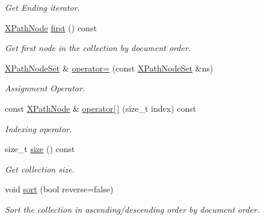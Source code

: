 \begin{DoxyCompactItemize}
\begin{DoxyCompactList}\small\item\em Get Ending iterator. \item\end{DoxyCompactList}\item 
\hyperlink{classphys_1_1xml_1_1XPathNode}{XPathNode} \hyperlink{classphys_1_1xml_1_1XPathNodeSet_ae38baf21701ebbe42af3abfb6976d100}{first} () const 
\begin{DoxyCompactList}\small\item\em Get first node in the collection by document order. \item\end{DoxyCompactList}\item 
\hyperlink{classphys_1_1xml_1_1XPathNodeSet}{XPathNodeSet} \& \hyperlink{classphys_1_1xml_1_1XPathNodeSet_a10ab6b5b2188af5d7db6930473fa0190}{operator=} (const \hyperlink{classphys_1_1xml_1_1XPathNodeSet}{XPathNodeSet} \&ns)
\begin{DoxyCompactList}\small\item\em Assignment Operator. \item\end{DoxyCompactList}\item 
const \hyperlink{classphys_1_1xml_1_1XPathNode}{XPathNode} \& \hyperlink{classphys_1_1xml_1_1XPathNodeSet_ad620a6cd79b94ae644d10a10d0519029}{operator\mbox{[}$\,$\mbox{]}} (size\_\-t index) const 
\begin{DoxyCompactList}\small\item\em Indexing operator. \item\end{DoxyCompactList}\item 
size\_\-t \hyperlink{classphys_1_1xml_1_1XPathNodeSet_a306178fdaf66f2d0ccefd617f7afc7f3}{size} () const 
\begin{DoxyCompactList}\small\item\em Get collection size. \item\end{DoxyCompactList}\item 
void \hyperlink{classphys_1_1xml_1_1XPathNodeSet_a509bb7206dfc0fa79887c7ab7c5999db}{sort} (bool reverse=false)
\begin{DoxyCompactList}\small\item\em Sort the collection in ascending/descending order by document order. \item\end{DoxyCompactList}\item 

\end{DoxyCompactItemize}
